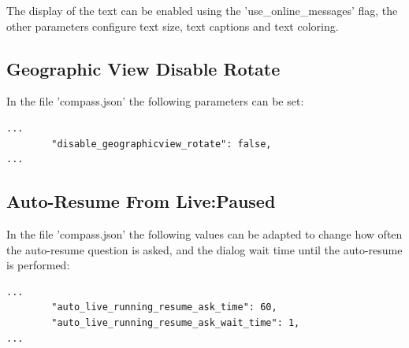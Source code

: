 The display of the text can be enabled using the 'use\_online\_messages' flag, the other parameters configure text size, text captions and text coloring.

\subsection{Geographic View Disable Rotate}

In the file 'compass.json' the following parameters can be set:

\begin{lstlisting}
...
        "disable_geographicview_rotate": false,
...        
\end{lstlisting}

\subsection{Auto-Resume From Live:Paused}
\label{sec:live_paused_resume}

In the file 'compass.json' the following values can be adapted to change how often the auto-resume question is asked, and the dialog wait time until the auto-resume is performed:

\begin{lstlisting}
...
        "auto_live_running_resume_ask_time": 60,
        "auto_live_running_resume_ask_wait_time": 1,
...        
\end{lstlisting}


